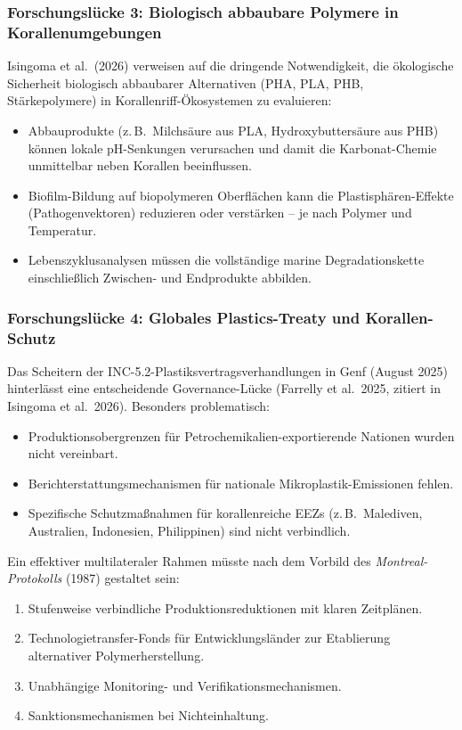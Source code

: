 ﻿\documentclass[12pt,a4paper]{article}
\theoremstyle{definition}
\theoremstyle{remark}
\newcommand{\MP}{Mikroplastik}
\begin{document}
\subsubsection{Forschungslücke 3: Biologisch abbaubare Polymere in Korallenumgebungen}

Isingoma et al.\ (2026) verweisen auf die dringende Notwendigkeit, die
ökologische Sicherheit biologisch abbaubarer Alternativen (PHA, PLA, PHB,
Stärkepolymere) in Korallenriff-Ökosystemen zu evaluieren:
\begin{itemize}[noitemsep, leftmargin=*]
  \item Abbauprodukte (z.\,B.\ Milchsäure aus PLA, Hydroxybuttersäure aus PHB)
    k\"onnen lokale pH-Senkungen verursachen und damit die Karbonat-Chemie
    unmittelbar neben Korallen beeinflussen.
  \item Biofilm-Bildung auf biopolymeren Oberflächen kann die
    Plastisphären-Effekte (Pathogenvektoren) reduzieren oder verstärken --
    je nach Polymer und Temperatur.
  \item Lebenszyklusanalysen m\"ussen die vollständige marine Degradationskette
    einschließlich Zwischen- und Endprodukte abbilden.
\end{itemize}

\subsubsection{Forschungslücke 4: Globales Plastics-Treaty und Korallen-Schutz}

Das Scheitern der INC-5.2-Plastiksvertragsverhandlungen in Genf (August 2025)
hinterlässt eine entscheidende Governance-Lücke (Farrelly et al.\ 2025,
zitiert in Isingoma et al.\ 2026). Besonders problematisch:
\begin{itemize}[noitemsep, leftmargin=*]
  \item Produktionsobergrenzen für Petrochemikalien-exportierende Nationen
    wurden nicht vereinbart.
  \item Berichterstattungsmechanismen für nationale \MP{}-Emissionen fehlen.
  \item Spezifische Schutzmaßnahmen für korallenreiche EEZs (z.\,B.\
    Malediven, Australien, Indonesien, Philippinen) sind nicht verbindlich.
\end{itemize}

Ein effektiver multilateraler Rahmen m\"usste nach dem Vorbild des
\textit{Montreal-Protokolls} (1987) gestaltet sein:
\begin{enumerate}[noitemsep, leftmargin=*]
  \item Stufenweise verbindliche Produktionsreduktionen mit klaren Zeitplänen.
  \item Technologietransfer-Fonds für Entwicklungsländer zur Etablierung
    alternativer Polymerherstellung.
  \item Unabhängige Monitoring- und Verifikationsmechanismen.
  \item Sanktionsmechanismen bei Nichteinhaltung.
\end{enumerate}
\end{document}
